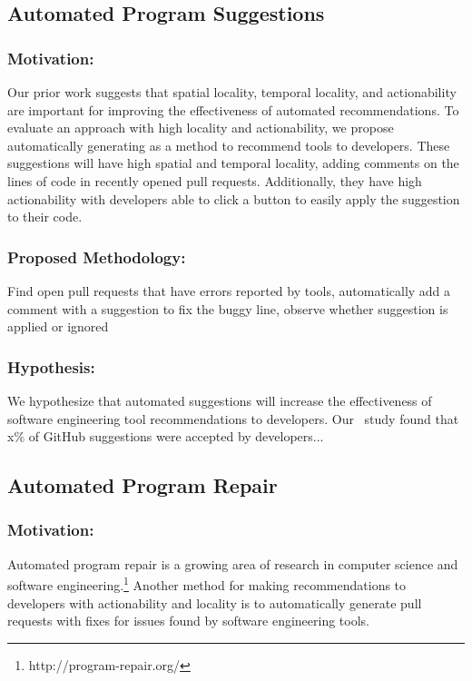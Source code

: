 \subsection{Automated Program Suggestions}

\subsubsection{Motivation:} 

Our prior work suggests that spatial locality, temporal locality, and actionability are important for improving the effectiveness of automated recommendations. To evaluate an approach with high locality and actionability, we propose automatically generating \SUGGS as a method to recommend tools to developers. These suggestions will have high spatial and temporal locality, adding comments on the lines of code in recently opened pull requests. Additionally, they have high actionability with developers able to click a button to easily apply the suggestion to their code.

\subsubsection{Proposed Methodology:}

Find open pull requests that have errors reported by tools, automatically add a comment with a suggestion to fix the buggy line, observe whether suggestion is applied or ignored

\subsubsection{Hypothesis:}

We hypothesize that automated suggestions will increase the effectiveness of software engineering tool recommendations to developers. Our \sugg~study found that x\% of GitHub suggestions were accepted by developers...

\subsection{Automated Program Repair}

\subsubsection{Motivation:}

Automated program repair is a growing area of research in computer science and software engineering.\footnote{http://program-repair.org/} Another method for making recommendations to developers with actionability and locality is to automatically generate pull requests with fixes for issues found by software engineering tools.

